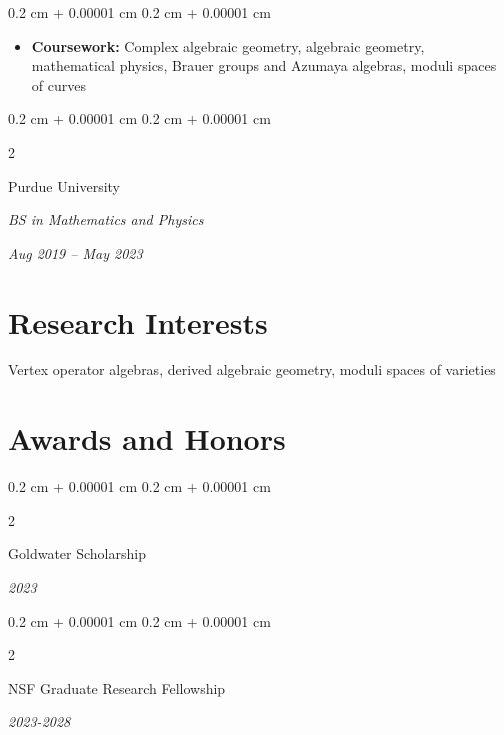\documentclass[10pt, letterpaper]{article}
\newenvironment{highlights}{
    \begin{itemize}[
        topsep=0.10 cm,
        parsep=0.10 cm,
        partopsep=0pt,
        itemsep=0pt,
        leftmargin=0.4 cm + 10pt
    ]
}{
    \end{itemize}
} %
\newenvironment{onecolentry}{
    \begin{adjustwidth}{
        0.2 cm + 0.00001 cm
    }{
        0.2 cm + 0.00001 cm
    }
}{
    \end{adjustwidth}
} %
\newenvironment{twocolentry}[2][]{
    \onecolentry
    \def\secondColumn{#2}
    \setcolumnwidth{\fill, 4.5 cm}
    \begin{paracol}{2}
}{
    \switchcolumn \raggedleft \secondColumn
    \end{paracol}
    \endonecolentry
} %
\begin{document}
        \vspace{0.10 cm}
        \begin{onecolentry}
            \begin{highlights}
                \item \textbf{Coursework:} Complex algebraic geometry, algebraic geometry, mathematical physics, Brauer groups and Azumaya algebras, moduli spaces of curves 
            \end{highlights}
        \end{onecolentry}
        \begin{twocolentry}{
            
            
        \textit{Aug 2019 – May 2023}}
            {Purdue University}

            \textit{BS in Mathematics and Physics}
        \end{twocolentry}



    
    \section{Research Interests}
        Vertex operator algebras, derived algebraic geometry, moduli spaces of varieties

    \section{Awards and Honors}
        \begin{twocolentry}{
            \textit{2023}}
                {Goldwater Scholarship}
            \end{twocolentry}
            \begin{twocolentry}{
            \textit{2023-2028}}
                {NSF Graduate Research Fellowship}
            \end{twocolentry}
    
\end{document}
